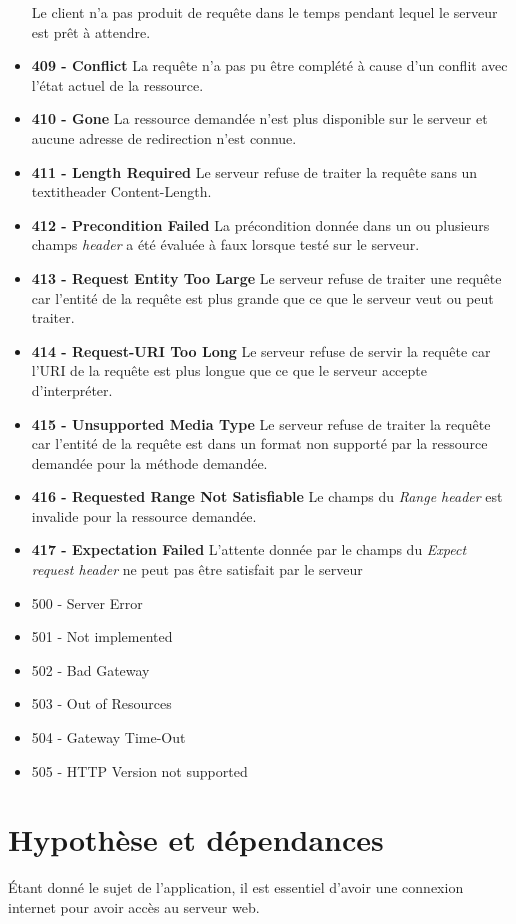 \documentclass{scrreprt}
\begin{document}
\begin{itemizen}
\begin{itemize}
 \subitem Le client n'a pas produit de requête dans le temps pendant lequel le serveur est prêt à attendre.
 \item \textbf{409 - Conflict}
 \subitem La requête n'a pas pu être complété à cause d'un conflit avec l'état actuel de la ressource.
 \item \textbf{410 - Gone}
 \subitem La ressource demandée n'est plus disponible sur le serveur et aucune adresse de redirection n'est connue.
 \item \textbf{411 - Length Required}
 \subitem Le serveur refuse de traiter la requête sans un textit{header} Content-Length.
 \item \textbf{412 - Precondition Failed}
 \subitem La précondition donnée dans un ou plusieurs champs \textit{header} a été évaluée à faux lorsque testé sur le serveur.
 \item \textbf{413 - Request Entity Too Large}
 \subitem Le serveur refuse de traiter une requête car l'entité de la requête est plus grande que ce que le serveur veut ou peut traiter.
 \item \textbf{414 - Request-URI Too Long}
 \subitem Le serveur refuse de servir la requête car l'URI de la requête est plus longue que ce que le serveur accepte d'interpréter.
 \item \textbf{415 - Unsupported Media Type}
 \subitem Le serveur refuse de traiter la requête car l'entité de la requête est dans un format non supporté par la ressource demandée pour la méthode demandée.
 \item \textbf{416 - Requested Range Not Satisfiable}
 \subitem Le champs du \textit{Range header} est invalide pour la ressource demandée.
 \item \textbf{417 - Expectation Failed}
 \subitem L'attente donnée par le champs du \textit{Expect request header} ne peut pas être satisfait par le serveur
 \item 500 - Server Error
 \subitem 

 \item 501 - Not implemented
 \item 502 - Bad Gateway
 \item 503 - Out of Resources
 \item 504 - Gateway Time-Out
 \item 505 - HTTP Version not supported

 \end{itemize}

 
    
\section{Hypothèse et dépendances}
Étant donné le sujet de l'application, il est essentiel d'avoir une connexion internet pour avoir accès au serveur web.\\




\end{itemizen}
\end{document}

